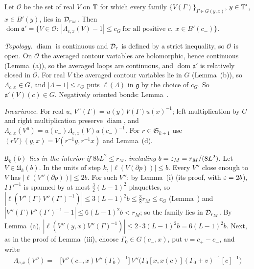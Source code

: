 \begin{detail}\label{d7:dom}
Let $\mathcal O$ be the set of real $V$ on $\mathbb T$ for which every family $\{V(\Gamma)\}_{\Gamma\in G(y,x)}$, $y\in\mathbb T'$, $x\in B'(y)$, lies in $\mathcal D_{r_M}$. Then $\operatorname{dom}\mathfrak a'=\{V\in\mathcal O:\ |\Lambda_{c,x}(V)-1|\le c_G\ \text{for all positive }c,\ x\in B'(c_-)\}$.
\begin{step}
\emph{Topology.} $\operatorname{diam}$ is continuous and $\mathcal D_r$ is defined by a strict inequality, so $\mathcal O$ is open. On $\mathcal O$ the averaged contour variables are holomorphic, hence continuous (Lemma~(a)), so the averaged loops are continuous, and $\operatorname{dom}\mathfrak a'$ is relatively closed in $\mathcal O$. For real $V$ the averaged contour variables lie in $G$ (Lemma~(b)), so $\Lambda_{c,x}\in G$, and $|\Lambda-1|\le c_G$ puts $\ell(\Lambda)$ in $\mathfrak g$ by the choice of $c_G$. So $\mathfrak a'(V)(c)\in G$. Negatively oriented bonds: Lemma~.
\end{step}
\begin{step}
\emph{Invariance.} For real $u$, $V^u(\Gamma)=u(y)V(\Gamma)u(x)^{-1}$; left multiplication by $G$ and right multiplication preserve $\operatorname{diam}$, and $\Lambda_{c,x}(V^u)=u(c_-)\Lambda_{c,x}(V)u(c_-)^{-1}$. For $r\in\mathfrak S_{k+1}$ use $(rV)(y,x)=V(r^{-1}y,r^{-1}x)$ and Lemma~(d).
\end{step}
\begin{step}
\emph{$\mathfrak U_k(b)$ lies in the interior if $8bL^2\le r_M$, including $b=\varepsilon_M=r_M/(8L^2)$.} Let $V\in\mathfrak U_k(b)$. In the units of step $k$, $|\ell(V(\partial p))|\le b$. Every $V''$ close enough to $V$ has $|\ell(V''(\partial p))|\le2b$. For such $V''$: by Lemma~(i) (its proof, with $\varepsilon=2b$), $\Gamma\Gamma'^{-1}$ is spanned by at most $\frac32(L-1)^2$ plaquettes, so $|\ell(V''(\Gamma)V''(\Gamma')^{-1})|\le3(L-1)^2b\le\frac38r_M\le c_G$ (Lemma~) and $|V''(\Gamma)V''(\Gamma')^{-1}-1|\le6(L-1)^2b<r_M$; so the family lies in $\mathcal D_{r_M}$. By Lemma~(a), $|\ell(V''(y,x)V''(\Gamma)^{-1})|\le2\cdot3(L-1)^2b=6(L-1)^2b$. Next, as in the proof of Lemma~(iii), choose $\Gamma_0\in G(c_-,x)$, put $v=c_+-c_-$, and write
\[
\begin{aligned}
\Lambda_{c,x}(V'')={}&\big[V''(c_-,x)V''(\Gamma_0)^{-1}\big]\,V''\big(\Gamma_0[x,x(c)](\Gamma_0+v)^{-1}[c]^{-1}\big)\\

\end{aligned}\]
\end{step}
\end{detail}
